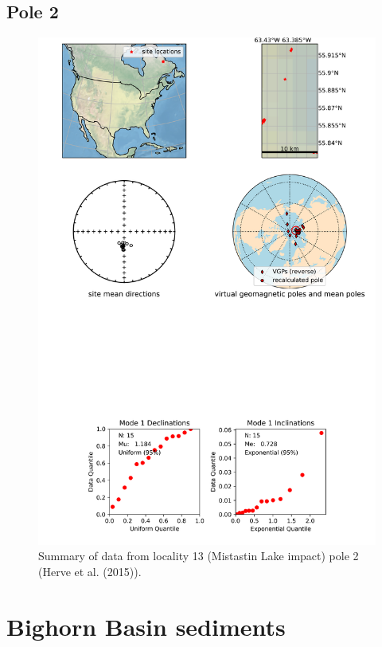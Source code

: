 \documentclass{article}
\begin{document}
\subsection{Pole 2}


\begin{figure}[H]
\centering
\includegraphics[width=5 in]{./13/2/pole_summary.png}
\caption{Summary of data from locality 13 (Mistastin Lake impact) pole 2 (Herve et al. (2015)).}
\end{figure}

\section{Bighorn Basin sediments}
\end{document}
